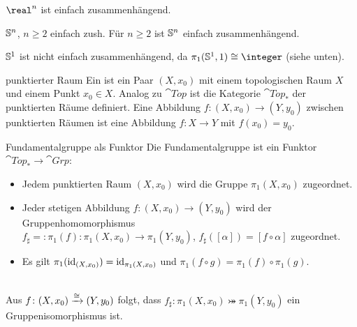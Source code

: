 \begin{Bsp}
    $\real^n$ ist einfach zusammenhängend.
\end{Bsp}

\begin{Satz}{$\mathbb{S}^n$, $n \ge 2$ einfach zush.}
    Für $n \ge 2$ ist $\mathbb{S}^n$ einfach zusammenhängend.
\end{Satz}

\begin{Bem}
    $\mathbb{S}^1$ ist nicht einfach zusammenhängend, da
    $\pi_1(\sphere^1, 1) \cong \integer$ (siehe unten).
\end{Bem}

\linie

\begin{Def}{punktierter Raum}
    Ein  ist ein Paar $(X, x_0)$ mit
    einem topologischen Raum $X$ und einem Punkt $x_0 \in X$.
    Analog zu $\cat{Top}$ ist die Kategorie $\cat{Top}_\ast$ der punktierten
    Räume definiert.
    Eine Abbildung $f\colon (X, x_0) \rightarrow (Y, y_0)$ zwischen
    punktierten Räumen ist eine Abbildung $f\colon X \rightarrow Y$ mit
    $f(x_0) = y_0$.
\end{Def}

\begin{Satz}{Fundamentalgruppe als Funktor}
    Die Fundamentalgruppe ist ein Funktor
    $\cat{Top}_\ast \rightarrow \cat{Grp}$:
    \begin{itemize}
        \item
        Jedem punktierten Raum $(X, x_0)$ wird die Gruppe $\pi_1(X, x_0)$
        zugeordnet.
        
        \item
        Jeder stetigen Abbildung $f\colon (X, x_0) \rightarrow (Y, y_0)$ wird
        der Gruppenhomomorphismus \\
        $f_\sharp =: \pi_1(f)\colon \pi_1(X, x_0) \rightarrow \pi_1(Y, y_0)$,
        $f_\sharp([\alpha]) = [f \circ \alpha]$ zugeordnet.
        
        \item
        Es gilt $\pi_1(\operatorname{id}_{(X, x_0)}) = \operatorname{id}_{\pi_1(X, x_0)}$ und
        $\pi_1(f \circ g) = \pi_1(f) \circ \pi_1(g)$.
    \end{itemize}
\end{Satz}

\begin{Kor}\\
    Aus $f\colon (X, x_0) \xrightarrow{\cong} (Y, y_0)$ folgt, dass
    $f_\sharp\colon \pi_1(X, x_0) \bij \pi_1(Y, y_0)$ ein
    Gruppenisomorphismus ist.
\end{Kor}

